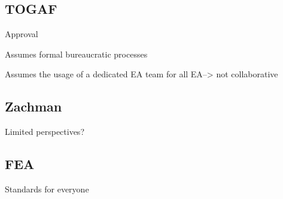 \subsection{TOGAF}
Approval

Assumes formal bureaucratic processes

Assumes the usage of a dedicated EA team for all EA--> not collaborative

\subsection{Zachman}
Limited perspectives?

\subsection{FEA}
Standards for everyone